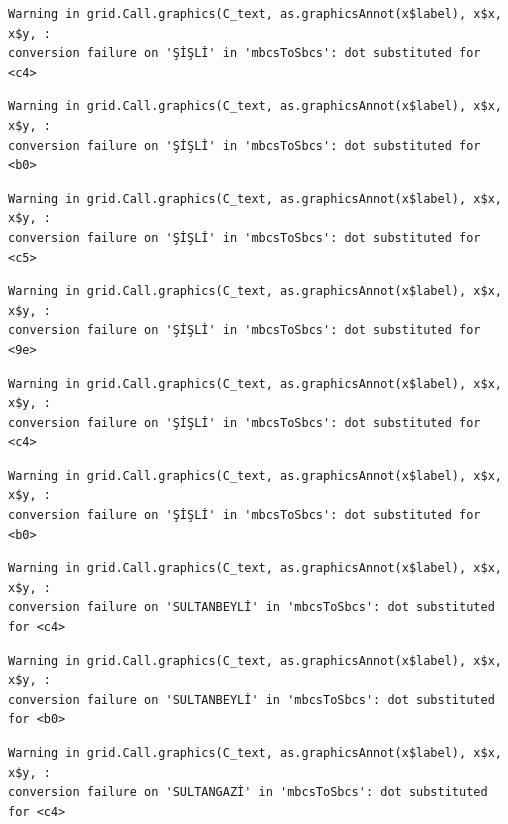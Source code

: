 \documentclass[
  11pt,
  a4paper,
  DIV=11,
  numbers=noendperiod]{scrartcl}
\begin{document}
\begin{verbatim}
Warning in grid.Call.graphics(C_text, as.graphicsAnnot(x$label), x$x, x$y, :
conversion failure on 'ŞİŞLİ' in 'mbcsToSbcs': dot substituted for <c4>
\end{verbatim}

\begin{verbatim}
Warning in grid.Call.graphics(C_text, as.graphicsAnnot(x$label), x$x, x$y, :
conversion failure on 'ŞİŞLİ' in 'mbcsToSbcs': dot substituted for <b0>
\end{verbatim}

\begin{verbatim}
Warning in grid.Call.graphics(C_text, as.graphicsAnnot(x$label), x$x, x$y, :
conversion failure on 'ŞİŞLİ' in 'mbcsToSbcs': dot substituted for <c5>
\end{verbatim}

\begin{verbatim}
Warning in grid.Call.graphics(C_text, as.graphicsAnnot(x$label), x$x, x$y, :
conversion failure on 'ŞİŞLİ' in 'mbcsToSbcs': dot substituted for <9e>
\end{verbatim}

\begin{verbatim}
Warning in grid.Call.graphics(C_text, as.graphicsAnnot(x$label), x$x, x$y, :
conversion failure on 'ŞİŞLİ' in 'mbcsToSbcs': dot substituted for <c4>
\end{verbatim}

\begin{verbatim}
Warning in grid.Call.graphics(C_text, as.graphicsAnnot(x$label), x$x, x$y, :
conversion failure on 'ŞİŞLİ' in 'mbcsToSbcs': dot substituted for <b0>
\end{verbatim}

\begin{verbatim}
Warning in grid.Call.graphics(C_text, as.graphicsAnnot(x$label), x$x, x$y, :
conversion failure on 'SULTANBEYLİ' in 'mbcsToSbcs': dot substituted for <c4>
\end{verbatim}

\begin{verbatim}
Warning in grid.Call.graphics(C_text, as.graphicsAnnot(x$label), x$x, x$y, :
conversion failure on 'SULTANBEYLİ' in 'mbcsToSbcs': dot substituted for <b0>
\end{verbatim}

\begin{verbatim}
Warning in grid.Call.graphics(C_text, as.graphicsAnnot(x$label), x$x, x$y, :
conversion failure on 'SULTANGAZİ' in 'mbcsToSbcs': dot substituted for <c4>
\end{verbatim}
\end{document}
